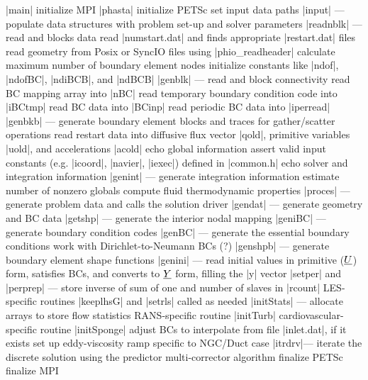 \documentclass[11pt]{article}
\begin{document}
\begin{outline}[deep]
\1 |main|
	\2 initialize MPI
	\2 |phasta|
		\3 initialize PETSc
		\3 set input data paths
		\3 |input| --- populate data structures with problem set-up and solver parameters
			\4 |readnblk| --- read and blocks data
				\5 read |numstart.dat| and finds appropriate |restart.dat| files
				\5 read geometry from Posix or SyncIO files using |phio_readheader|
				\5 calculate maximum number of boundary element nodes
				\5 initialize constants like |ndof|, |ndofBC|, |ndiBCB|, and |ndBCB|
				\5 |genblk| --- read and block connectivity
				\5 read BC mapping array into |nBC|
				\5 read temporary boundary condition code into |iBCtmp|
				\5 read BC data into |BCinp|
				\5 read periodic BC data into |iperread|
				\5 |genbkb| --- generate boundary element blocks and traces for gather/scatter operations
				\5 read restart data into diffusive flux vector |qold|, primitive variables |uold|, and accelerations |acold|
			\4 echo global information
			\4 assert valid input constants (e.g. |icoord|, |navier|, |iexec|) defined in |common.h|
			\4 echo solver and integration information
			\4 |genint| --- generate integration information
			\4 estimate number of nonzero globals
			\4 compute fluid thermodynamic properties
		\3 |proces| --- generate problem data and calls the solution driver
			\4 |gendat| --- generate geometry and BC data
				\5 |getshp| --- generate the interior nodal mapping
				\5 |geniBC| --- generate boundary condition codes
				\5 |genBC| --- generate the essential boundary conditions
				\5 work with Dirichlet-to-Neumann BCs (?)
				\5 |genshpb| --- generate boundary element shape functions
				\5 |genini| --- read initial values in primitive ($\underline{U}$) form, satisfies BCs, and converts to $\underline{Y}$ form, filling the |y| vector
			\4 |setper| and |perprep| --- store inverse of sum of one and number of slaves in |rcount|
			\4 LES-specific routines |keeplhsG| and |setrls| called as needed
			\4 |initStats| --- allocate arrays to store flow statistics
			\4 RANS-specific routine |initTurb|
			\4 cardiovascular-specific routine |initSponge|
			\4 adjust BCs to interpolate from file |inlet.dat|, if it exists
			\4 set up eddy-viscosity ramp specific to NGC/Duct case
			\4 |itrdrv|\ra --- iterate the discrete solution using the predictor multi-corrector algorithm
		\3 finalize PETSc
	\2 finalize MPI
\end{outline}
\end{document}
